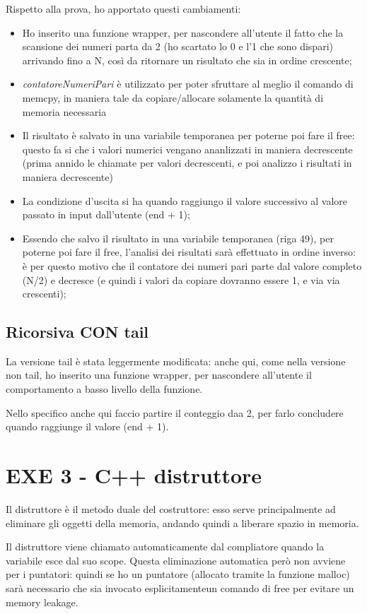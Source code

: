 Rispetto alla prova, ho apportato questi cambiamenti:
\begin{itemize}
	\item Ho inserito una funzione wrapper, per nascondere all'utente il fatto che la scansione dei numeri parta da 2 (ho scartato lo 0 e l'1 che sono dispari) arrivando fino a N, così da ritornare un risultato che sia in ordine crescente;
	\item \textit{contatoreNumeriPari} è utilizzato per poter sfruttare al meglio il comando di memcpy, in maniera tale da copiare/allocare solamente la quantità di memoria necessaria
	\item Il risultato è salvato in una variabile temporanea per poterne poi fare il free: questo fa si che i valori numerici vengano ananlizzati in maniera decrescente (prima annido le chiamate per valori decrescenti, e poi analizzo i risultati in maniera decrescente)
	\item La condizione d'uscita si ha quando raggiungo il valore successivo al valore passato in input dall'utente (end + 1);
	\item Essendo che salvo il risultato in una variabile temporanea (riga 49), per poterne poi fare il free, l'analisi dei risultati sarà effettuato in ordine inverso: è per questo motivo che il contatore dei numeri pari parte dal valore completo (N/2) e decresce (e quindi i valori da copiare dovranno essere 1, e via via crescenti);
\end{itemize}

\subsection{Ricorsiva CON tail}
La versione tail è stata leggermente modificata: anche qui, come nella versione non tail, ho inserito una funzione wrapper, per nascondere all'utente il comportamento a basso livello della funzione.

Nello specifico anche qui faccio partire il conteggio daa 2, per farlo concludere quando raggiunge il valore (end + 1).

\section{EXE 3 - C++ distruttore}
Il distruttore è il metodo duale del costruttore: esso serve principalmente ad eliminare gli oggetti
della memoria, andando quindi a liberare spazio in memoria.

Il distruttore viene chiamato automaticamente dal compliatore quando la variabile esce dal suo scope.
Questa eliminazione automatica però non avviene per i puntatori: quindi se ho un puntatore (allocato tramite la funzione malloc) sarà necessario che sia invocato esplicitamenteun comando di free per evitare un memory leakage.

